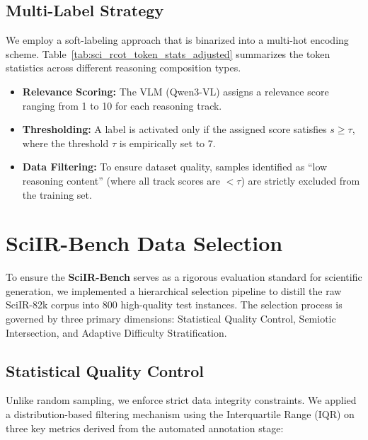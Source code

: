 \documentclass[runningheads]{llncs}
\begin{document}
\subsection{Multi-Label Strategy}
We employ a soft-labeling approach that is binarized into a multi-hot encoding scheme. 
Table~\ref{tab:sci_rcot_token_stats_adjusted} summarizes the token statistics across different reasoning composition types.
\begin{itemize}
    \item \textbf{Relevance Scoring:} The VLM (Qwen3-VL) assigns a relevance score ranging from 1 to 10 for each reasoning track.
    \item \textbf{Thresholding:} A label is activated only if the assigned score satisfies $s \ge \tau$, where the threshold $\tau$ is empirically set to 7.
    \item \textbf{Data Filtering:} To ensure dataset quality, samples identified as ``low reasoning content'' (where all track scores are $<\tau$) are strictly excluded from the training set.
\end{itemize}

\section{SciIR-Bench Data Selection}
\label{sec:benchmark_construction}

To ensure the \textbf{SciIR-Bench} serves as a rigorous evaluation standard for scientific generation, we implemented a hierarchical selection pipeline to distill the raw SciIR-82k corpus into 800 high-quality test instances. The selection process is governed by three primary dimensions: Statistical Quality Control, Semiotic Intersection, and Adaptive Difficulty Stratification.

\subsection{Statistical Quality Control}
Unlike random sampling, we enforce strict data integrity constraints. We applied a distribution-based filtering mechanism using the Interquartile Range (IQR) on three key metrics derived from the automated annotation stage:
\end{document}
